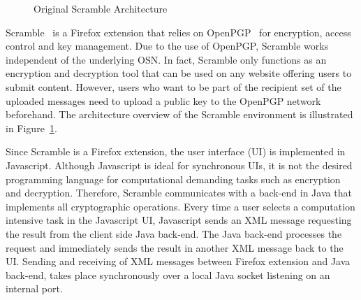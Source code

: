 \begin{figure}
\begin{center}
{{
        }
    }
    \end{center}
    \caption{Original Scramble Architecture}
    \label{fig:original_scramble_arch}
\end{figure}
\enlargethispage{\baselineskip}
Scramble~\cite{art:BeatoKW11} is a Firefox extension that relies on OpenPGP~\cite{rfc4880} for encryption, access control and key management. Due to the use of OpenPGP, Scramble works independent of the underlying OSN. In fact, Scramble only functions as an encryption and decryption tool that can be used on any website offering users to submit content. However, users who want to be part of the recipient set of the uploaded messages need to upload a public key to the OpenPGP network beforehand. The architecture overview of the Scramble environment is illustrated in Figure~\ref{fig:original_scramble_arch}.

Since Scramble is a Firefox extension, the user interface (UI) is implemented in Javascript. Although Javascript is ideal for synchronous UIs, it is not the desired programming language for computational demanding tasks such as encryption and decryption. Therefore, Scramble communicates with a back-end in Java that implements all cryptographic operations. Every time a user selects a computation intensive task in the Javascript UI, Javascript sends an XML message requesting the result from the client side Java back-end. The Java back-end processes the request and immediately sends the result in another XML message back to the UI. Sending and receiving of XML messages between Firefox extension and Java back-end, takes place synchronously over a local Java socket listening on an internal port.


